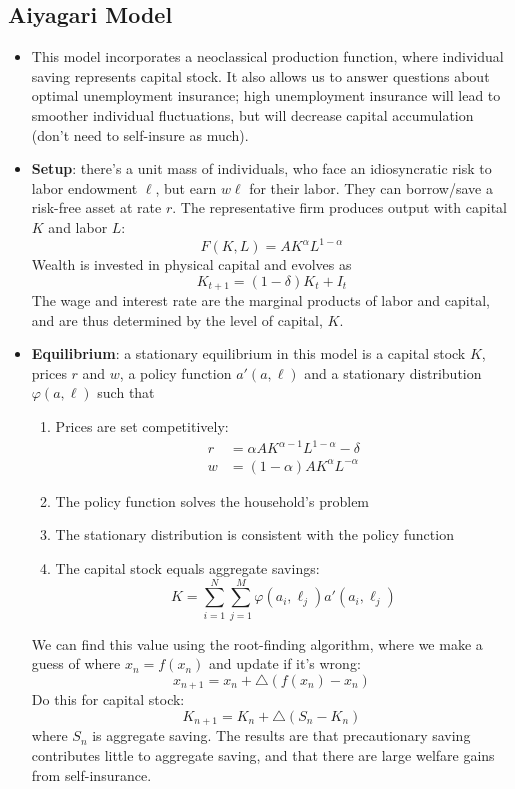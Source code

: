 \documentclass[12pt]{article}
\begin{document}
\subsection{Aiyagari Model}

\begin{itemize}
    \item This model incorporates a neoclassical production function, where individual saving represents capital stock. It also allows us to answer questions about optimal unemployment insurance; high unemployment insurance will lead to smoother individual fluctuations, but will decrease capital accumulation (don't need to self-insure as much). 
    \item \textbf{Setup}: there's a unit mass of individuals, who face an idiosyncratic risk to labor endowment $\ell$, but earn $w\ell$ for their labor. They can borrow/save a risk-free asset at rate $r$. The representative firm produces output with capital $K$ and labor $L$:
    \[F(K,L) = AK^{\alpha}L^{1-\alpha}\]
    Wealth is invested in physical capital and evolves as
    \[K_{t+1} = (1-\delta)K_t + I_t\]
    The wage and interest rate are the marginal products of labor and capital, and are thus determined by the level of capital, $K$. 
    \item \textbf{Equilibrium}: a stationary equilibrium in this model is a capital stock $K$, prices $r$ and $w$, a policy function $a'(a,\ell)$ and a stationary distribution $\varphi(a,\ell)$ such that
    \begin{enumerate}
        \item Prices are set competitively:
        \[\begin{split}
            r &= \alpha AK^{\alpha - 1}L^{1-\alpha} -\delta\\
            w &= (1-\alpha)AK^{\alpha}L^{-\alpha}
        \end{split}\]
        \item The policy function solves the household's problem
        \item The stationary distribution is consistent with the policy function
        \item The capital stock equals aggregate savings:
        \[K = \sum_{i=1}^N\sum_{j=1}^M\varphi(a_i,\ell_j)a'(a_i,\ell_j)\]
    \end{enumerate}
    We can find this value using the root-finding algorithm, where we make a guess of where $x_n = f(x_n)$ and update if it's wrong:
    \[x_{n+1} = x_n + \triangle (f(x_n) - x_n)\]
    Do this for capital stock:
    \[K_{n+1} = K_n + \triangle(S_n - K_n)\]
    where $S_n$ is aggregate saving. The results are that precautionary saving contributes little to aggregate saving, and that there are large welfare gains from self-insurance.
\end{itemize}
\end{document}
